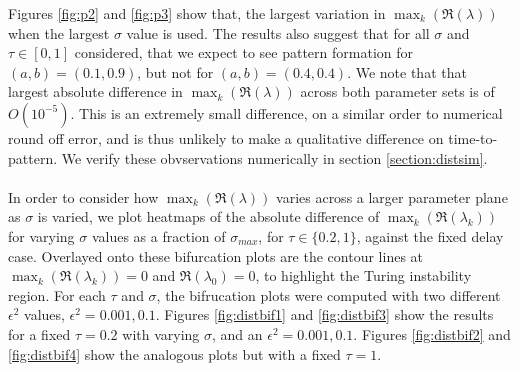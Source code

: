 Figures \ref{fig:p2} and \ref{fig:p3} show that, the largest variation in $\max_k(\Re(\lambda))$ when the largest $\sigma$ value is used. The results also suggest that for all $\sigma$ and $\tau\in[0,1]$ considered, that we expect to see pattern formation for $(a,b)=(0.1,0.9)$, but not for $(a,b)=(0.4,0.4)$. We note that that largest absolute difference in $\max_k(\Re(\lambda))$ across both parameter sets is of $O(10^{-5})$. This is an extremely small difference, on a similar order to numerical round off error, and is thus unlikely to make a qualitative difference on time-to-pattern. We verify these obvservations numerically in section \ref{section:distsim}.
\\\\
 In order to consider how $\max_k(\Re(\lambda))$ varies across a larger parameter plane as $\sigma$ is varied, we plot heatmaps of the absolute difference of $\max_k(\Re(\lambda_k))$ for varying $\sigma$ values as a fraction of $\sigma_{max}$, for $\tau\in\{0.2,1\}$, against the fixed delay case. Overlayed onto these bifurcation plots are the contour lines at $\max_k(\Re(\lambda_k))=0$ and $\Re(\lambda_0)=0$, to highlight the Turing instability region. For each $\tau$ and $\sigma$, the bifrucation plots were computed with two different $\epsilon^2$ values, $\epsilon^2=0.001,0.1$. Figures \ref{fig:distbif1} and \ref{fig:distbif3} show the results for a fixed $\tau=0.2$ with varying $\sigma$, and an $\epsilon^2=0.001,0.1$. Figures \ref{fig:distbif2} and \ref{fig:distbif4} show the analogous plots but with a fixed $\tau=1$.

